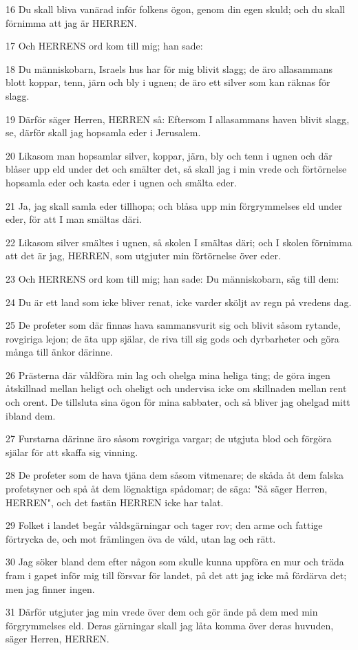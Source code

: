 \par 16 Du skall bliva vanärad inför folkens ögon, genom din egen skuld; och du skall förnimma att jag är HERREN.
\par 17 Och HERRENS ord kom till mig; han sade:
\par 18 Du människobarn, Israels hus har för mig blivit slagg; de äro allasammans blott koppar, tenn, järn och bly i ugnen; de äro ett silver som kan räknas för slagg.
\par 19 Därför säger Herren, HERREN så: Eftersom I allasammans haven blivit slagg, se, därför skall jag hopsamla eder i Jerusalem.
\par 20 Likasom man hopsamlar silver, koppar, järn, bly och tenn i ugnen och där blåser upp eld under det och smälter det, så skall jag i min vrede och förtörnelse hopsamla eder och kasta eder i ugnen och smälta eder.
\par 21 Ja, jag skall samla eder tillhopa; och blåsa upp min förgrymmelses eld under eder, för att I man smältas däri.
\par 22 Likasom silver smältes i ugnen, så skolen I smältas däri; och I skolen förnimma att det är jag, HERREN, som utgjuter min förtörnelse över eder.
\par 23 Och HERRENS ord kom till mig; han sade: Du människobarn, säg till dem:
\par 24 Du är ett land som icke bliver renat, icke varder sköljt av regn på vredens dag.
\par 25 De profeter som där finnas hava sammansvurit sig och blivit såsom rytande, rovgiriga lejon; de äta upp själar, de riva till sig gods och dyrbarheter och göra många till änkor därinne.
\par 26 Prästerna där våldföra min lag och ohelga mina heliga ting; de göra ingen åtskillnad mellan heligt och oheligt och undervisa icke om skillnaden mellan rent och orent. De tillsluta sina ögon för mina sabbater, och så bliver jag ohelgad mitt ibland dem.
\par 27 Furstarna därinne äro såsom rovgiriga vargar; de utgjuta blod och förgöra själar för att skaffa sig vinning.
\par 28 De profeter som de hava tjäna dem såsom vitmenare; de skåda åt dem falska profetsyner och spå åt dem lögnaktiga spådomar; de säga: "Så säger Herren, HERREN", och det fastän HERREN icke har talat.
\par 29 Folket i landet begår våldsgärningar och tager rov; den arme och fattige förtrycka de, och mot främlingen öva de våld, utan lag och rätt.
\par 30 Jag söker bland dem efter någon som skulle kunna uppföra en mur och träda fram i gapet inför mig till försvar för landet, på det att jag icke må fördärva det; men jag finner ingen.
\par 31 Därför utgjuter jag min vrede över dem och gör ände på dem med min förgrymmelses eld. Deras gärningar skall jag låta komma över deras huvuden, säger Herren, HERREN.

